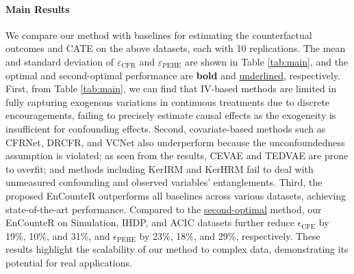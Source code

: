 \documentclass[journal]{IEEEtran}
\begin{document}
\paragraph{Main Results} We compare our method with baselines for estimating the counterfactual outcomes and CATE on the above datasets, each with 10 replications. The mean and standard deviation of $\varepsilon_{\text{CFR}}$ and $\varepsilon_{\text{PEHE}}$ are shown in Table \ref{tab:main}, and the optimal and second-optimal performance are \textbf{bold} and \underline{underlined}, respectively. 
First, from Table \ref{tab:main}, we can find that IV-based methods are limited in fully capturing exogenous variations in continuous treatments due to discrete encouragements, failing to precisely estimate causal effects as the exogeneity is insufficient for confounding effects. Second, covariate-based methods such as CFRNet, DRCFR, and VCNet also underperform because the unconfoundedness assumption is violated; as seen from the results, CEVAE and TEDVAE are prone to overfit; and methods including KerIRM and KerHRM fail to deal with unmeasured confounding and observed variables' entanglements. 
Third, the proposed EnCounteR outperforms all baselines across various datasets, achieving state-of-the-art performance. Compared to the \underline{second-optimal} method, our EnCounteR on Simulation, IHDP, and ACIC datasets further reduce $\epsilon_{\text{CFE}}$ by 19\%, 10\%, and 31\%, and $\epsilon_{\text{PEHE}}$ by 23\%, 18\%, and 29\%, respectively. These results highlight the scalability of our method to complex data, demonstrating its potential for real applications. 
\end{document}
